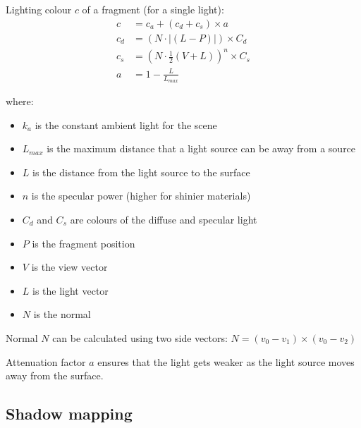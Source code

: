 \documentclass[a4paper]{article}
\begin{document}
Lighting colour $c$ of a fragment (for a single light):
\begin{align*}
  c &= c_{a} + (c_{d} + c_{s}) \times a \\
  c_{d} &= (N \cdot |(L - P)|) \times C_{d} \\
  c_{s} &= (N \cdot \frac{1}{2}(V + L))^{n} \times C_{s}\\
  a &= 1 - \frac{L}{L_{max}}
\end{align*}

where:

\begin{itemize}
  \item
    $k_{a}$ is the constant ambient light for the scene

  \item
    $L_{max}$ is the maximum distance that a light source can be away from a
    source

  \item
    $L$ is the distance from the light source to the surface

  \item
    $n$ is the specular power (higher for shinier materials)

  \item
    $C_{d}$ and $C_{s}$ are colours of the diffuse and specular light

  \item
    $P$ is the fragment position

  \item
    $V$ is the view vector

  \item
    $L$ is the light vector

  \item
    $N$ is the normal

\end{itemize}

Normal $N$ can be calculated using two side vectors: $N = (v_{0} - v_{1}) \times
(v_{0} - v_{2})$

Attenuation factor $a$ ensures that the light gets weaker as the light source
moves away from the surface.

\subsection{Shadow mapping}
\end{document}
